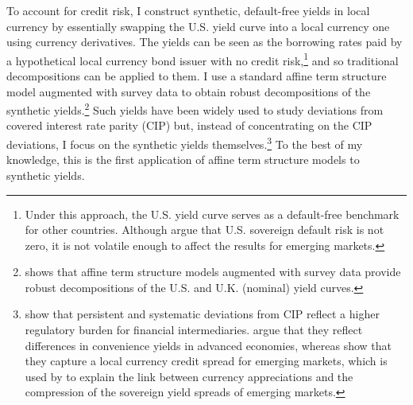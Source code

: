 {To account for credit risk, I construct synthetic, default-free yields in local currency by essentially swapping the U.S. yield curve into a local currency one using currency derivatives. 
The yields can be seen as the borrowing rates paid by a hypothetical local currency bond issuer with no credit risk,\footnote{ Under this approach, the U.S. yield curve serves as a default-free benchmark for other countries. Although \cite{ACCS:2021} argue that U.S. sovereign default risk is not zero, it is not volatile enough to affect the results for emerging markets.} and so traditional decompositions can be applied to them. I use a standard affine term structure model augmented with survey data to obtain robust decompositions of the synthetic yields.\footnote{ \cite{Guimaraes:2014} shows that affine term structure models augmented with survey data provide robust decompositions of the U.S. and U.K. (nominal) yield curves.} Such yields have been widely used to study deviations from covered interest rate parity (CIP) but, instead of concentrating on the CIP deviations, I focus on the synthetic yields themselves.\footnote{ \cite{DuTepperVerdelhan:2018} show that persistent and systematic deviations from CIP reflect a higher regulatory burden for financial intermediaries. \cite{DuImSchreger:2018JIE} argue that they reflect differences in convenience yields in advanced economies, whereas \cite{DuSchreger:2016JoF} show that they capture a local currency credit spread for emerging markets, which is used by \cite{HofmannShimShin:2020} to explain the link between currency appreciations and the compression of the sovereign yield spreads of emerging markets.} To the best of my knowledge, this is the first application of affine term structure models to synthetic yields. 

}

